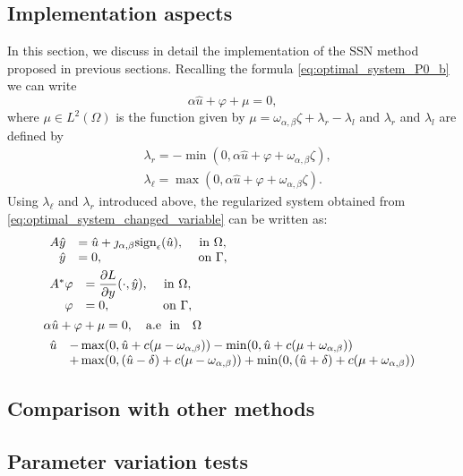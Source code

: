 \documentclass[11pt,a4paper]{amsart}
\newcommand{\om}{\Omega}
\newcommand{\ga}{\Gamma}
\newcommand{\sign}{\mathrm{sign}}
\begin{document}
\subsection{Implementation aspects}
In this section, we discuss in detail the implementation of the SSN method proposed in previous sections. Recalling the formula \eqref{eq:optimal_system_P0_b}\, we can write
\begin{equation}
    \alpha\hat u + \varphi +\mu =0, 
\end{equation}
where $\mu \in L^2(\om)$ is the function given by $\mu = \omega_{\alpha,\beta} \zeta + \lambda_r-\lambda_l$ and $\lambda_r$ and $\lambda_l$ are defined by 
\begin{align}
    &\lambda_r = -\min(0,\alpha \hat u  + \varphi  + \omega_{\alpha,\beta}\zeta), \\
    &\lambda_\ell =\max(0,\alpha \hat u  + \varphi  + \omega_{\alpha,\beta}\zeta).
\end{align}
Using $\lambda_\ell$ and $\lambda_r$ introduced above, the regularized system obtained from \eqref{eq:optimal_system_changed_variable} can be written as:
\begin{subequations}\label{eq:KKT-like}
	\begin{align}
&\begin{array}{rlc}\label{eq:KKT_1}
	A\hat y  & = \hat u + \jmath_{\alpha,\beta}\sign_\epsilon(\hat u), & \text{ in } \om, \\
      \hat y &= 0, & \text{ on } \ga,  
\end{array}\\
%
&\begin{array}{rlc}\label{eq:KKT_2}
	A^*\varphi  & = \dfrac{\partial L}{\partial y}(\cdot,\hat y),& \text{ in } \om, \\
      \varphi &= 0, & \text{ on } \ga ,
\end{array} \\
&\alpha \hat u +\varphi + \mu =0, \quad\text{a.e\,\, in}\quad \om \label{eq:KKT_3}\\
&\begin{array}{ll}\label{eq:KKT_4}
 \hat u &- \max(0, \hat u  +c(\mu-\omega_{\alpha,\beta}) )- \min(0, \hat u  +c(\mu+\omega_{\alpha,\beta}) )\\
 &+\max(0,(\hat u-\delta)+c (\mu-\omega_{\alpha,\beta})) + \min(0,(\hat u+\delta)+ c(\mu+\omega_{\alpha,\beta}))
\end{array}
\end{align}
\end{subequations}	
\subsection{Comparison with other methods}
\subsection{Parameter variation tests}



\end{document}
